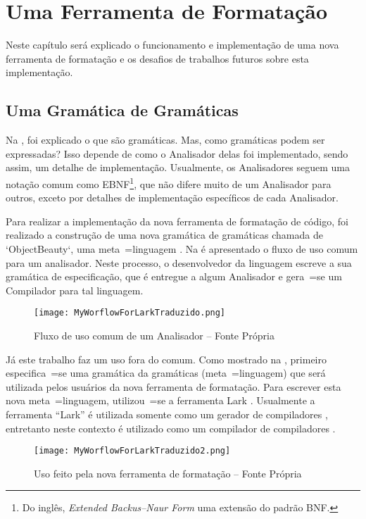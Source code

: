 

\chapter{Uma Ferramenta de Formatação}
\label{software_implementation}

Neste capítulo será explicado o funcionamento e
implementação de uma nova ferramenta de formatação e
os desafios de trabalhos futuros sobre esta implementação.


\section{Uma Gramática de Gramáticas}

Na ,
foi explicado o que são gramáticas.
Mas,
como gramáticas podem ser expressadas?
Isso depende de como o Analisador delas foi implementado,
sendo assim,
um detalhe de implementação.
Usualmente,
os Analisadores seguem uma notação comum como EBNF\footnote{
Do inglês,
\textit{Extended Backus–Naur Form} uma extensão do padrão BNF.
}\cite{teachingEbnf,antlrBookTerrentParr},
que não difere muito de um Analisador para outros,
exceto por detalhes de implementação específicos de cada Analisador.

Para realizar a implementação da nova ferramenta de formatação de código,
foi realizado a construção de uma nova gramática de gramáticas chamada de `ObjectBeauty`,
uma meta~=linguagem \cite{compilersCompilerMetaLanguage}.
Na  é apresentado o fluxo de uso comum para um analisador.
Neste processo,
o desenvolvedor da linguagem escreve a sua gramática de especificação,
que é entregue a algum Analisador e
gera~=se um Compilador para tal linguagem.
\begin{figure}[h]
\centering
\texttt{[image: MyWorflowForLarkTraduzido.png]}
\caption[Fluxo de uso comum de um Analisador]{Fluxo de uso comum de um Analisador -- Fonte Própria}
\label{MyWorflowForLarkTraduzido}
\end{figure}

Já este trabalho faz um uso fora do comum.
Como mostrado na ,
primeiro especifica~=se uma gramática da gramáticas (meta~=linguagem) que será utilizada pelos usuários da nova ferramenta de formatação.
Para escrever esta nova meta~=linguagem,
utilizou~=se a ferramenta Lark \cite{larkContextualLexer}.
Usualmente a ferramenta ``Lark'' é utilizada somente como um gerador de compiladores ,
entretanto neste contexto é utilizado como um compilador de compiladores .
\begin{figure}[h]
\centering
\texttt{[image: MyWorflowForLarkTraduzido2.png]}
\caption[Uso feito pela nova ferramenta de formatação]{Uso feito pela nova ferramenta de formatação -- Fonte Própria}
\label{MyWorflowForLarkTraduzido2}
\end{figure}

